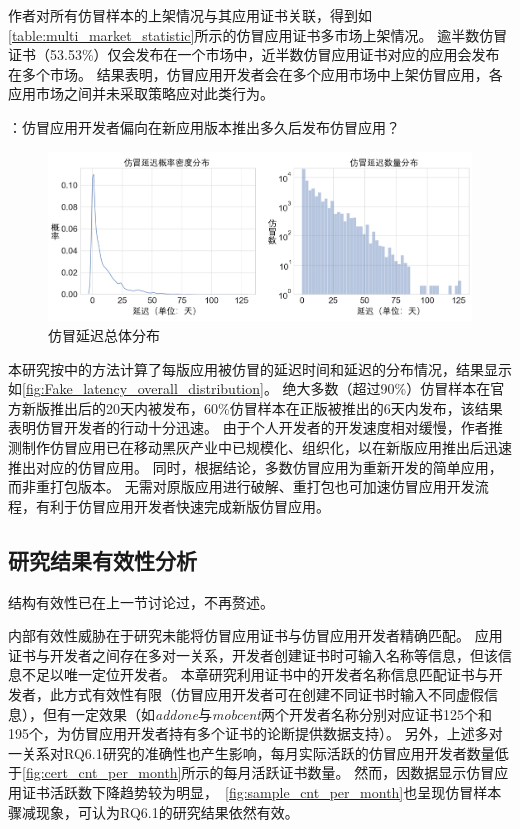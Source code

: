 作者对所有仿冒样本的上架情况与其应用证书关联，得到如\autoref{table:multi_market_statistic}所示的仿冒应用证书多市场上架情况。
逾半数仿冒证书（53.53\%）仅会发布在一个市场中，近半数仿冒应用证书对应的应用会发布在多个市场。
结果表明，仿冒应用开发者会在多个应用市场中上架仿冒应用，各应用市场之间并未采取策略应对此类行为。

：仿冒应用开发者偏向在新应用版本推出多久后发布仿冒应用？

\begin{figure}[h]
    \centering
    \includegraphics[width=\textwidth]{./Figures/edwin-Fake_latency_overall_distribution2.png}
    \caption{仿冒延迟总体分布}
    \label{fig:Fake_latency_overall_distribution}
\end{figure}

本研究按中的方法计算了每版应用被仿冒的延迟时间和延迟的分布情况，结果显示如\autoref{fig:Fake_latency_overall_distribution}。
绝大多数（超过90\%）仿冒样本在官方新版推出后的20天内被发布，60\%仿冒样本在正版被推出的6天内发布，该结果表明仿冒开发者的行动十分迅速。
由于个人开发者的开发速度相对缓慢，作者推测制作仿冒应用已在移动黑灰产业中已规模化、组织化，以在新版应用推出后迅速推出对应的仿冒应用。
同时，根据结论，多数仿冒应用为重新开发的简单应用，而非重打包版本。
无需对原版应用进行破解、重打包也可加速仿冒应用开发流程，有利于仿冒应用开发者快速完成新版仿冒应用。

\subsection{研究结果有效性分析}

结构有效性已在上一节讨论过，不再赘述。

内部有效性威胁在于研究未能将仿冒应用证书与仿冒应用开发者精确匹配。
应用证书与开发者之间存在多对一关系，开发者创建证书时可输入名称等信息，但该信息不足以唯一定位开发者。
本章研究利用证书中的开发者名称信息匹配证书与开发者，此方式有效性有限（仿冒应用开发者可在创建不同证书时输入不同虚假信息），但有一定效果（如\emph{addone}与\emph{mobcent}两个开发者名称分别对应证书125个和195个，为仿冒应用开发者持有多个证书的论断提供数据支持）。
另外，上述多对一关系对RQ6.1研究的准确性也产生影响，每月实际活跃的仿冒应用开发者数量低于\autoref{fig:cert_cnt_per_month}所示的每月活跃证书数量。
然而，因数据显示仿冒应用证书活跃数下降趋势较为明显，~\autoref{fig:sample_cnt_per_month}也呈现仿冒样本骤减现象，可认为RQ6.1的研究结果依然有效。

